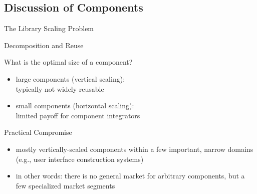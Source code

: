 \subsection[Discussion]{Discussion of Components}
\begin{frame}{The Library Scaling Problem}
	\begin{mycolumns}[animation=none]
		\begin{exampletight}{Decomposition and Reuse}
		\end{exampletight}
	\mynextcolumn
		\begin{definition}{What is the optimal size of a component?}
			\begin{itemize}
				\item large components (vertical scaling):\\typically not widely reusable
				\item small components (horizontal scaling):\\limited payoff for component integrators
			\end{itemize}
		\end{definition}
		\pause
		\begin{note}{Practical Compromise}
			\begin{itemize}
				\item mostly vertically-scaled components within a few important, narrow domains (e.g., user interface construction systems)
				\item in other words: there is no general market for arbitrary components, but a few specialized market segments %
			\end{itemize}
		\end{note}
	\end{mycolumns}
\end{frame}

